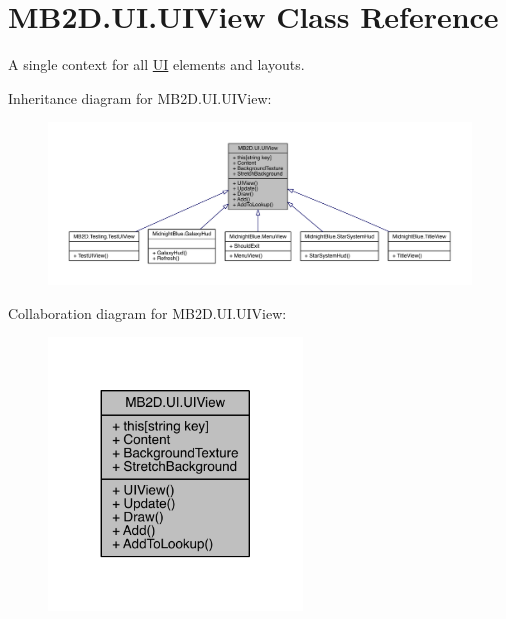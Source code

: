 \hypertarget{class_m_b2_d_1_1_u_i_1_1_u_i_view}{}\section{M\+B2\+D.\+U\+I.\+U\+I\+View Class Reference}
\label{class_m_b2_d_1_1_u_i_1_1_u_i_view}


A single context for all \hyperlink{namespace_m_b2_d_1_1_u_i}{UI} elements and layouts.  




Inheritance diagram for M\+B2\+D.\+U\+I.\+U\+I\+View\+:
\nopagebreak
\begin{figure}[H]
\begin{center}
\leavevmode
\includegraphics[width=350pt]{class_m_b2_d_1_1_u_i_1_1_u_i_view__inherit__graph}
\end{center}
\end{figure}


Collaboration diagram for M\+B2\+D.\+U\+I.\+U\+I\+View\+:
\nopagebreak
\begin{figure}[H]
\begin{center}
\leavevmode
\includegraphics[width=191pt]{class_m_b2_d_1_1_u_i_1_1_u_i_view__coll__graph}
\end{center}
\end{figure}
